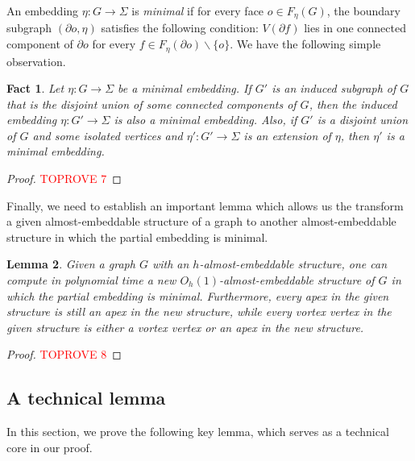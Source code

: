 \documentclass[a4paper,11pt]{article}
\newtheorem{lemma}{Lemma}
\numberwithin{lemma}{section}
\newtheorem{fact}[lemma]{Fact}
\begin{document}
An embedding $\eta\colon G \rightarrow \varSigma$ is \emph{minimal} if for every face $o \in F_\eta(G)$, the boundary subgraph $(\partial o,\eta)$ satisfies the following condition: $V(\partial f)$ lies in one connected component of $\partial o$ for every $f \in F_\eta(\partial o) \backslash \{o\}$.
We have the following simple observation.

\begin{fact}\label{fact-minimal}
Let $\eta\colon G \rightarrow \varSigma$ be a minimal embedding.
If $G'$ is an induced subgraph of $G$ that is the disjoint union of some connected components of $G$, then the induced embedding $\eta\colon G' \rightarrow \varSigma$ is also a minimal embedding.
Also, if $G'$ is a disjoint union of $G$ and some isolated vertices and $\eta'\colon G' \rightarrow \varSigma$ is an extension of $\eta$, then $\eta'$ is a minimal embedding.
\end{fact}

\begin{proof}\textcolor{red}{TOPROVE 7}\end{proof}

Finally, we need to establish an important lemma which allows us the transform a given almost-embeddable structure of a graph to another almost-embeddable structure in which the partial embedding is minimal.

\begin{lemma}\label{lem-minimal}
Given a graph $G$ with an $h$-almost-embeddable structure, one can compute in polynomial time a new $O_h(1)$-almost-embeddable structure of $G$ in which the partial embedding is minimal.
Furthermore, every apex in the given structure is still an apex in the new structure, while every vortex vertex in the given structure is either a vortex vertex or an apex in the new structure.
\end{lemma}

\begin{proof}\textcolor{red}{TOPROVE 8}\end{proof}
 
\subsection{A technical lemma}
In this section, we prove the following key lemma, which serves as a technical core in our proof.
\end{document}
